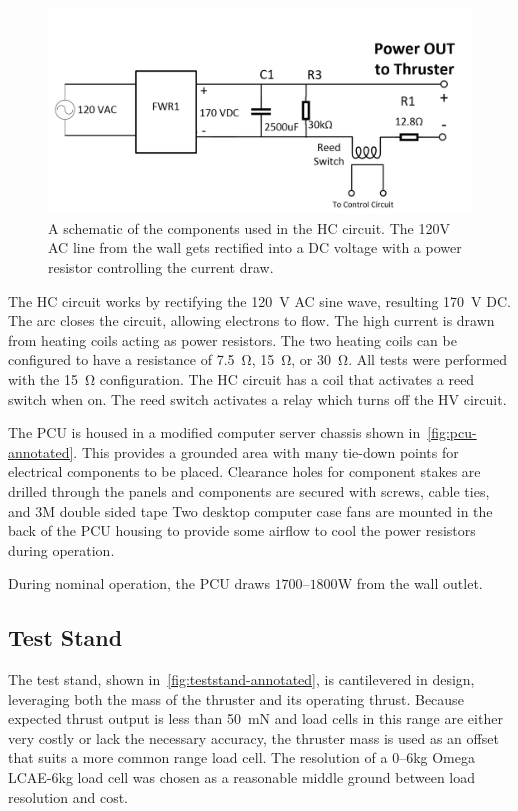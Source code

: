 \documentclass[conference]{IEEEtran}
\begin{document}
\begin{figure}[htp]
  \includegraphics[width=\linewidth]{figs/hc-schematic.png}
  \caption{A schematic of the components used in the HC circuit.
  The 120V AC line from the wall gets rectified into a DC voltage with a power resistor controlling the current draw.
\label{fig:hc-circuit}
}
\end{figure}

The HC circuit works by rectifying the \SI{120}{\volt} AC sine wave, resulting \SI{170}{\volt} DC.\@
The arc closes the circuit, allowing electrons to flow.
The high current is drawn from heating coils acting as power resistors.
The two heating coils can be configured to have a resistance of \SI{7.5}{\ohm}, \SI{15}{\ohm}, or \SI{30}{\ohm}.
All tests were performed with the \SI{15}{\ohm} configuration.
The HC circuit has a coil that activates a reed switch when on.
The reed switch activates a relay which turns off the HV circuit.

The PCU is housed in a modified computer server chassis shown in~\autoref{fig:pcu-annotated}.
This provides a grounded area with many tie-down points for electrical components to be placed.
Clearance holes for component stakes are drilled through the panels and components are secured with screws, cable ties, and 3M double sided tape
Two desktop computer case fans are mounted in the back of the PCU housing to provide some airflow to cool the power resistors during operation.

During nominal operation, the PCU draws $1700$--$1800$\si{\watt} from the wall outlet.

\subsection{Test Stand}
The test stand, shown in~\autoref{fig:teststand-annotated}, is cantilevered in design, leveraging both the mass of the thruster and its operating thrust.
Because expected thrust output is less than \SI{50}{\milli\newton} and load cells in this range are either very costly or lack the necessary accuracy, the thruster mass is used as an offset that suits a more common range load cell.
The resolution of a 0--6\si{\kilo\gram} Omega LCAE-6kg load cell was chosen as a reasonable middle ground between load resolution and cost.
\end{document}
